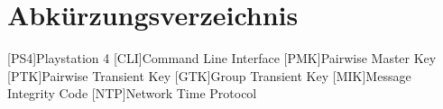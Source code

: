 \section*{Abkürzungsverzeichnis}
\begin{acronym}
    [PS4]{Playstation 4}
    [CLI]{Command Line Interface}
    [PMK]{Pairwise Master Key}
    [PTK]{Pairwise Transient Key}
    [GTK]{Group Transient Key}
    [MIK]{Message Integrity Code}
    [NTP]{Network Time Protocol}
\end{acronym}